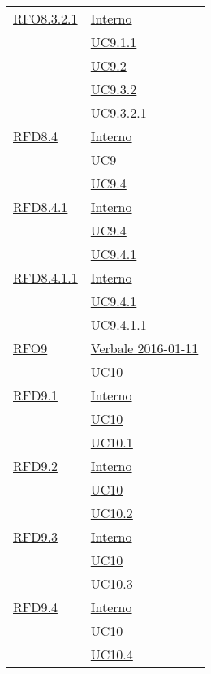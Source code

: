 \begin{longtable}{|>{\centering}m{5cm}|m{5cm}<{\centering}|}
\hyperlink{RFO8.3.2.1}{RFO8.3.2.1} & \hyperlink{Interno}{Interno}\\
& \hyperref[UC9.1.1]{UC9.1.1}\\
& \hyperref[UC9.2]{UC9.2}\\
& \hyperref[UC9.3.2]{UC9.3.2}\\
& \hyperref[UC9.3.2.1]{UC9.3.2.1}\\ \hline

\hyperlink{RFD8.4}{RFD8.4} & \hyperlink{Interno}{Interno}\\
& \hyperref[UC9]{UC9}\\
& \hyperref[UC9.4]{UC9.4}\\ \hline

\hyperlink{RFD8.4.1}{RFD8.4.1} & \hyperlink{Interno}{Interno}\\
& \hyperref[UC9.4]{UC9.4}\\
& \hyperref[UC9.4.1]{UC9.4.1}\\ \hline

\hyperlink{RFD8.4.1.1}{RFD8.4.1.1} & \hyperlink{Interno}{Interno}\\
& \hyperref[UC9.4.1]{UC9.4.1}\\
& \hyperref[UC9.4.1.1]{UC9.4.1.1}\\ \hline

\hyperlink{RFO9}{RFO9} & \hyperlink{Verbale 2016-01-11}{Verbale 2016-01-11}\\
& \hyperref[UC10]{UC10}\\ \hline

\hyperlink{RFD9.1}{RFD9.1} & \hyperlink{Interno}{Interno}\\
& \hyperref[UC10]{UC10}\\
& \hyperref[UC10.1]{UC10.1}\\ \hline

\hyperlink{RFD9.2}{RFD9.2} & \hyperlink{Interno}{Interno}\\
& \hyperref[UC10]{UC10}\\
& \hyperref[UC10.2]{UC10.2}\\ \hline

\hyperlink{RFD9.3}{RFD9.3} & \hyperlink{Interno}{Interno}\\
& \hyperref[UC10]{UC10}\\
& \hyperref[UC10.3]{UC10.3}\\ \hline

\hyperlink{RFD9.4}{RFD9.4} & \hyperlink{Interno}{Interno}\\
& \hyperref[UC10]{UC10}\\
& \hyperref[UC10.4]{UC10.4}\\ \hline


\end{longtable}
